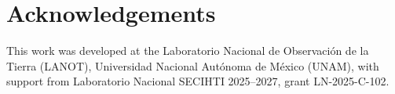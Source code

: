 \documentclass[preprint,12pt]{elsarticle}
\begin{document}
\section*{Acknowledgements}

This work was developed at the Laboratorio Nacional de Observaci\'on de la
Tierra (LANOT), Universidad Nacional Aut\'onoma de M\'exico (UNAM), with
support from Laboratorio Nacional SECIHTI 2025--2027, grant LN-2025-C-102.



\end{document}
